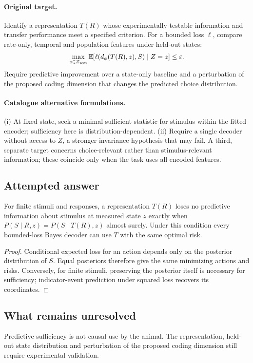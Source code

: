 \documentclass[11pt]{article}
\begin{document}
\paragraph{Original target.}
Identify a representation $T(R)$ whose experimentally testable information and transfer performance meet a specified criterion. For a bounded loss $\ell$, compare rate-only, temporal and population features under held-out states:
\[
\max_{z\in Z_{\rm test}}\mathbb{E}[\ell(d_\phi(T(R),z),S)\mid Z=z]\leq\varepsilon.
\]
Require predictive improvement over a state-only baseline and a perturbation of the proposed coding dimension that changes the predicted choice distribution.
\paragraph{Catalogue alternative formulations.}
(i) At fixed state, seek a minimal sufficient statistic for stimulus within the fitted encoder; sufficiency here is distribution-dependent. (ii) Require a single decoder without access to $Z$, a stronger invariance hypothesis that may fail. A third, separate target concerns choice-relevant rather than stimulus-relevant information; these coincide only when the task uses all encoded features.
\subsection{Attempted answer}
\begin{proposition}
For finite stimuli and responses, a representation $T(R)$ loses no predictive information about stimulus at measured state $z$ exactly when $P(S\mid R,z)=P(S\mid T(R),z)$ almost surely. Under this condition every bounded-loss Bayes decoder can use $T$ with the same optimal risk.
\end{proposition}
\begin{proof}
Conditional expected loss for an action depends only on the posterior distribution of $S$. Equal posteriors therefore give the same minimizing actions and risks. Conversely, for finite stimuli, preserving the posterior itself is necessary for sufficiency; indicator-event prediction under squared loss recovers its coordinates.
\end{proof}
\subsection{What remains unresolved}
Predictive sufficiency is not causal use by the animal. The representation, held-out state distribution and perturbation of the proposed coding dimension still require experimental validation.
\end{document}
